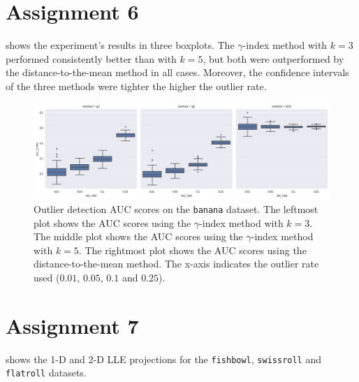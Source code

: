 \documentclass[a4paper,11pt]{article}
\begin{document}
\section*{Assignment 6}


 shows the experiment's results in three boxplots. The
$\gamma$-index method with $k=3$ performed consistently better than with $k=5$, but
both were outperformed by the distance-to-the-mean method in all cases.
Moreover, the confidence intervals of the three methods were tighter the higher the
outlier rate.

\begin{figure}
	\centering
	\includegraphics[width=\textwidth]{images/assignment6.png}
	\caption{Outlier detection AUC scores on the \texttt{banana} dataset.
			 The leftmost plot shows the AUC scores using the $\gamma$-index
			 method with $k=3$.
		     The middle plot shows the AUC scores using the $\gamma$-index
		     method with $k=5$.
	         The rightmost plot shows the AUC scores using the
	         distance-to-the-mean method.
	         The x-axis indicates the outlier rate used ($0.01$, $0.05$,
	         $0.1$ and $0.25$).}
	\label{fig:assignment6}
\end{figure}

\section*{Assignment 7}

 shows the 1-D and 2-D LLE projections for the \verb|fishbowl|, \verb|swissroll| and \verb|flatroll| datasets.
\end{document}
